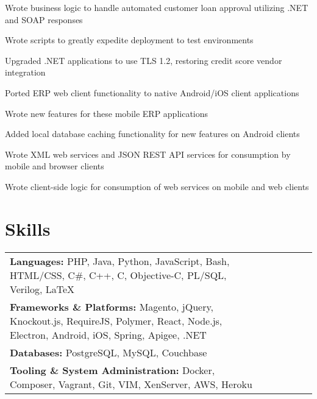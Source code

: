 \documentclass[line]{resume}
\begin{document}
\begin{myitemize}
	\item Wrote business logic to handle automated customer loan approval utilizing .NET and SOAP responses
	\item Wrote scripts to greatly expedite deployment to test environments
	\item Upgraded .NET applications to use TLS 1.2, restoring credit score vendor integration
\end{myitemize}

\begin{myitemize}
	\item Ported ERP web client functionality to native Android/iOS client applications
	\item Wrote new features for these mobile ERP applications
	\item Added local database caching functionality for new features on Android clients
	\item Wrote XML web services and JSON REST API services for consumption by mobile and browser clients
	\item Wrote client-side logic for consumption of web services on mobile and web clients
\end{myitemize}

\section{Skills}
\begin{tabular}{l l l l l l}
	\textbf{Languages:} PHP, Java, Python, JavaScript, Bash, HTML/CSS, C\#, C++, C, Objective-C, PL/SQL, Verilog, \LaTeX \\
	\textbf{Frameworks \& Platforms:} Magento, jQuery, Knockout.js, RequireJS, Polymer, React, Node.js, Electron, Android, iOS, Spring, Apigee, .NET \\
	\textbf{Databases:} PostgreSQL, MySQL, Couchbase \\
	\textbf{Tooling \& System Administration:} Docker, Composer, Vagrant, Git, VIM, XenServer, AWS, Heroku \\
\end{tabular}
\end{document}

